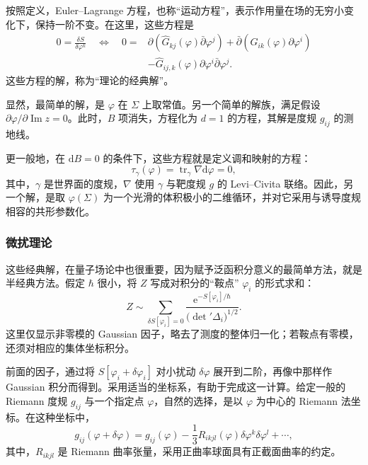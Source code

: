 \begin{definition*}\label{def:3.sigma-model-equations}
按照定义，Euler--Lagrange 方程，也称“运动方程”，表示作用量在场的无穷小变化下，保持一阶不变。在这里，这些方程是
\begin{equation}\label{eq:3.76}
\begin{aligned}
0=\frac{\delta S}{\delta\varphi^k}\quad\Longleftrightarrow\quad
0={}&\partial\!\left(\widehat G_{kj}(\varphi)
\bar\partial\varphi^j\right)
+\bar\partial\!\left(\widehat G_{ik}(\varphi)
\partial\varphi^i\right)\\
&-\widehat G_{ij,k}(\varphi)
\partial\varphi^i\bar\partial\varphi^j.
\end{aligned}
\end{equation}
这些方程的解，称为“理论的经典解”。
\end{definition*}
显然，最简单的解，是 $\varphi$ 在 $\Sigma$ 上取常值。另一个简单的解族，满足假设 $\partial\varphi/\partial\operatorname{Im}z=0$。此时，$B$ 项消失，方程化为 $d=1$ 的方程，其解是度规 $g_{ij}$ 的测地线。

更一般地，在 $\mathrm{d}B=0$ 的条件下，这些方程就是定义调和映射的方程：
\[
\tau_\gamma(\varphi)
=\operatorname{tr}_\gamma\nabla\mathrm{d}\varphi=0,
\]
其中，$\gamma$ 是世界面的度规，$\nabla$ 使用 $\gamma$ 与靶度规 $g$ 的 Levi--Civita 联络。因此，另一个解，是取 $\varphi(\Sigma)$ 为一个光滑的体积极小的二维循环，并对它采用与诱导度规相容的共形参数化。

\subsubsection{微扰理论}\label{sec:3.2.6.1}

这些经典解，在量子场论中也很重要，因为赋予泛函积分意义的最简单方法，就是半经典方法。假定 $\hbar$ 很小，将 $Z$ 写成对积分的“鞍点” $\varphi_i$ 的形式求和：
\begin{equation}\label{eq:3.77}
Z\sim\sum_{\delta S[\varphi_i]=0}
\frac{\mathrm{e}^{-S[\varphi_i]/\hbar}}
{\bigl(\det{}'\Delta_i\bigr)^{1/2}}.
\end{equation}
这里仅显示非零模的 Gaussian 因子，略去了测度的整体归一化；若鞍点有零模，还须对相应的集体坐标积分。

前面的因子，通过将 $S[\varphi_i+\delta\varphi_i]$ 对小扰动 $\delta\varphi$ 展开到二阶，再像中那样作 Gaussian 积分而得到。采用适当的坐标系，有助于完成这一计算。给定一般的 Riemann 度规 $g_{ij}$ 与一个指定点 $\varphi$，自然的选择，是以 $\varphi$ 为中心的 Riemann 法坐标。在这种坐标中，
\[
g_{ij}(\varphi+\delta\varphi)
=g_{ij}(\varphi)-\frac13R_{ikjl}(\varphi)
\delta\varphi^k\delta\varphi^l+\cdots,
\]
其中，$R_{ikjl}$ 是 Riemann 曲率张量，采用正曲率球面具有正截面曲率的约定。

